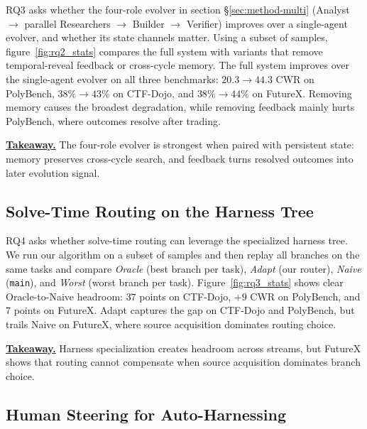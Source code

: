 RQ3 asks whether the four-role evolver in section \S\ref{sec:method-multi} (Analyst $\to$ parallel Researchers $\to$ Builder $\to$ Verifier) improves over a single-agent evolver, and whether its state channels matter. Using a subset of samples, figure~\ref{fig:rq2_stats} compares the full system with variants that remove temporal-reveal feedback or cross-cycle memory. The full system improves over the single-agent evolver on all three benchmarks: $20.3 \to 44.3$ CWR on PolyBench, $38\% \to 43\%$ on CTF-Dojo, and $38\% \to 44\%$ on FutureX. Removing memory causes the broadest degradation, while removing feedback mainly hurts PolyBench, where outcomes resolve after trading. 

\noindent\underline{\textbf{Takeaway.}} The four-role evolver is strongest when paired with persistent state: memory preserves cross-cycle search, and feedback turns resolved outcomes into later evolution signal.



\subsection{Solve-Time Routing on the Harness Tree}
\label{sec:navloss}

RQ4 asks whether solve-time routing can leverage the specialized harness tree. We run our algorithm on a subset of samples and then replay all branches on the same tasks and compare \emph{Oracle} (best branch per task), \emph{Adapt} (our router), \emph{Naive} (\texttt{main}), and \emph{Worst} (worst branch per task). Figure~\ref{fig:rq3_stats} shows clear Oracle-to-Naive headroom: $37$ points on CTF-Dojo, $+9$ CWR on PolyBench, and $7$ points on FutureX. Adapt captures the gap on CTF-Dojo and PolyBench, but trails Naive on FutureX, where source acquisition dominates routing choice.

\noindent\underline{\textbf{Takeaway.}} Harness specialization creates headroom across streams, but FutureX shows that routing cannot compensate when source acquisition dominates branch choice.

\subsection{Human Steering for Auto-Harnessing}
\label{sec:hitl}

